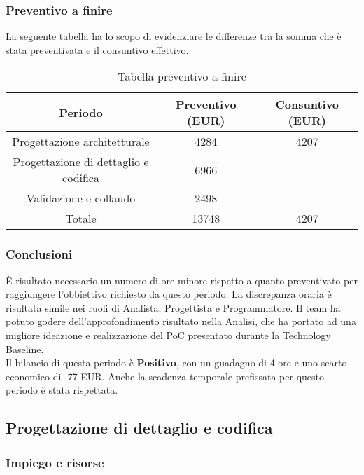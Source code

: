 \subsubsection{Preventivo a finire}
La seguente tabella ha lo scopo di evidenziare le differenze tra la somma che è stata preventivata e il consuntivo effettivo.
\begin{table}[h]
	\caption{Tabella preventivo a finire}  
	\begin{center}
		\begin{tabular}{ |c|c|c|  }
			\hline
			Periodo 								& Preventivo (EUR) & Consuntivo (EUR)\\
			\hline\hline
			Progettazione architetturale			& 4284 				& 4207\\
			Progettazione di dettaglio e codifica	& 6966 			& -\\
			Validazione e collaudo					& 2498 			& -\\
			\hline\hline
			Totale									& 13748 				& 4207 \\
			\hline
		\end{tabular}
	\end{center}
\end{table}
 

\subsubsection{Conclusioni}
È risultato necessario un numero di ore minore rispetto a quanto preventivato per raggiungere l'obbiettivo richiesto da questo periodo. La discrepanza oraria è risultata simile nei ruoli di Analista, Progettista e Programmatore. Il team ha potuto godere dell'approfondimento risultato nella Analisi, che ha portato ad una migliore ideazione e realizzazione del PoC presentato durante la Technology Baseline.
\\Il bilancio di questa periodo è \textbf{Positivo}, con un guadagno di 4 ore e uno scarto economico di -77 EUR. Anche la scadenza temporale prefissata per questo periodo è stata rispettata.
\subsection{Progettazione di dettaglio e codifica}
\subsubsection{Impiego e risorse}


